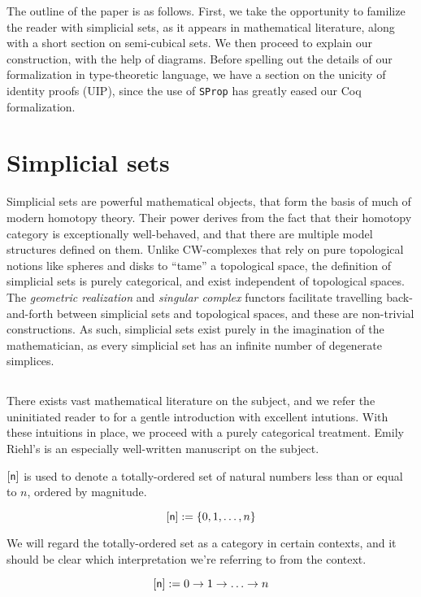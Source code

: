 \documentclass[10pt]{art}
\begin{document}
The outline of the paper is as follows. First, we take the opportunity to familize the reader with simplicial sets, as it appears in mathematical literature, along with a short section on semi-cubical sets. We then proceed to explain our construction, with the help of diagrams. Before spelling out the details of our formalization in type-theoretic language, we have a section on the unicity of identity proofs (UIP), since the use of \texttt{SProp} has greatly eased our Coq formalization.

\section{Simplicial sets}
Simplicial sets are powerful mathematical objects, that form the basis of much of modern homotopy theory. Their power derives from the fact that their homotopy category is exceptionally well-behaved, and that there are multiple model structures defined on them. Unlike CW-complexes that rely on pure topological notions like spheres and disks to ``tame'' a topological space, the definition of simplicial sets is purely categorical, and exist independent of topological spaces. The \emph{geometric realization} and \emph{singular complex} functors facilitate travelling back-and-forth between simplicial sets and topological spaces, and these are non-trivial constructions. As such, simplicial sets exist purely in the imagination of the mathematician, as every simplicial set has an infinite number of degenerate simplices.

\subsection{\texorpdfstring{\SSet}{The category of simplicial sets}}
There exists vast mathematical literature on the subject, and we refer the uninitiated reader to \cite{Friedman08} for a gentle introduction with excellent intutions. With these intuitions in place, we proceed with a purely categorical treatment. Emily Riehl's \cite{Riehl11} is an especially well-written manuscript on the subject.

\begin{definition}[\sq{n}]
  $\mathsf{[n]}$ is used to denote a totally-ordered set of natural numbers less than or equal to $n$, ordered by magnitude.

  \begin{equation*}
    \mathsf{[n]} := \{0, 1, \ldots, n\}
  \end{equation*}

  We will regard the totally-ordered set as a category in certain contexts, and it should be clear which interpretation we're referring to from the context.

  \begin{equation*}
    \mathsf{[n]} := 0 \rightarrow 1 \rightarrow \ldots \rightarrow n
  \end{equation*}
\end{definition}
\end{document}
